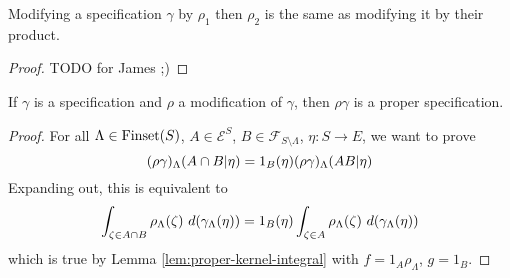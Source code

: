 \begin{lemma}
    \label{lem:modification-modification}
    \leanok

    Modifying a specification $\gamma$ by $\rho_1$ then $\rho_2$ is the same as modifying it by their product.
\end{lemma}
\begin{proof}

    TODO for James ;)
\end{proof}


\begin{lemma}
    \label{lem:modification-proper}
    \leanok

    If $\gamma$ is a specification and $\rho$ a modification of $\gamma$, then $\rho\gamma$ is a proper specification.
\end{lemma}
\begin{proof}
    \leanok

    For all $\Lambda \in \operatorname{Finset}(S)$, $A \in \mathcal E^S$, $B \in \mathcal{F}_{S\setminus\Lambda}$, $\eta : S \to E$, we want to prove
    $$(\rho\gamma)_\Lambda(A \cap B | \eta) = 1_B(\eta) (\rho\gamma)_\Lambda(A B | \eta)$$
    Expanding out, this is equivalent to
    $$\int_{\zeta \in A \inter B} \rho_\Lambda(\zeta)\ d(\gamma_\Lambda(\eta)) = 1_B(\eta) \int_{\zeta \in A} \rho_\Lambda(\zeta)\ d(\gamma_\Lambda(\eta))$$
    which is true by Lemma \ref{lem:proper-kernel-integral} with $f = 1_A\rho_\Lambda$, $g = 1_B$.
\end{proof}





